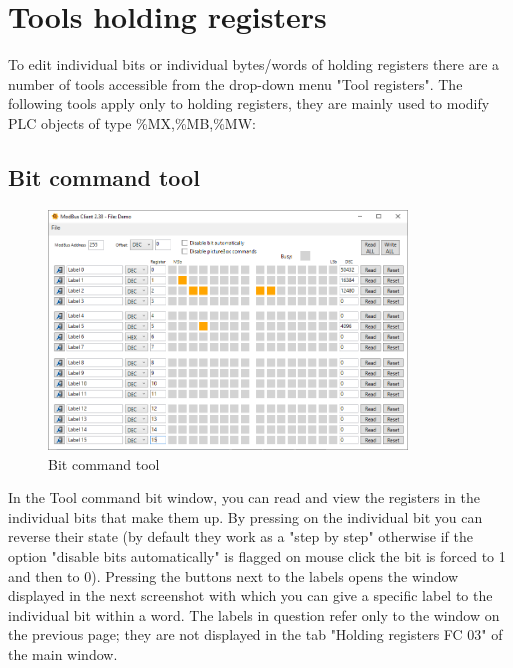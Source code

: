 
\chapter{Tools holding registers}

To edit individual bits or individual bytes/words of holding registers
there are a number of tools 
accessible from the drop-down menu
"Tool registers". The following tools apply only to holding registers, 
they are mainly used to
modify PLC objects of type \%MX,\%MB,\%MW:

\section{Bit command tool}

\begin{figure}[H]
\centering
\includegraphics[width=0.85\textwidth]{../Img/Tool_Command_Bit.PNG}
\caption{Bit command tool}
\label{holding_main_win}
\end{figure}

In the Tool command bit window, you can read and view the registers in the individual bits
that make them up. By pressing on the individual bit you can reverse their state
(by default they work as a "step by step" otherwise 
if the option "disable bits automatically" is flagged on mouse click the bit is
forced to 1 and then to 0).
\newpage
Pressing the buttons next to the labels opens the window displayed in the next 
screenshot with
which you can give a specific label to the individual bit
within a word. The labels in question
refer only to the window on the previous page; they are not displayed in the tab 
"Holding registers FC 03" of the main window.


